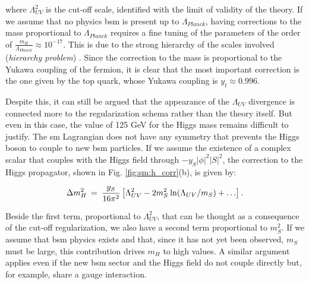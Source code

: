 where $\Lambda_{UV}^2$ is the cut-off scale, identified with the limit of validity of the theory. If we assume that no physics \gls{bsm} is present up to $\Lambda_{Planck}$, having corrections to the mass proportional to $\Lambda_{Planck}$ requires a fine tuning of the parameters of the order of $\frac{m_H}{\Lambda_{Planck}} \approx 10^{-17}$. This is due to the strong hierarchy of the scales involved (\textit{hierarchy problem}) \cite{Weinberg:1975gm, PhysRevD.20.2619, PhysRevD.14.1667, tHooft:1979rat}. Since the correction to the mass is proportional to the Yukawa coupling of the fermion, it is clear that the most important correction is the one given by the top quark, whose Yukawa coupling is $y_t \approx 0.996$. 

Despite this, it can still be argued that the appearance of the $\Lambda_{UV}$ divergence is connected more to the regularization schema rather than the theory itself. But even in this case, the value of 125 GeV for the Higgs mass remains difficult to justify. The \gls{sm} Lagrangian does not have any symmetry that prevents the Higgs boson to couple to new \gls{bsm} particles. If we assume the existence of a complex scalar that couples with the Higgs field through $ -y_S|\phi|^2 |S|^2$, the correction to the Higgs propagator, shown in Fig. \ref{fig:sm:h_corr}(b), is given by:

\begin{equation}
\Delta m_H^2 \>=\> {y_S\over 16 \pi^2}
\left [\Lambda_{UV}^2 - 2 m_S^2
\> {\rm ln}(\Lambda_{UV}/m_S) + \ldots
\right ].
\label{eq:divhs}
\end{equation}

\noindent Beside the first term, proportional to $\Lambda_{UV}^2$, that can be thought as a consequence of the cut-off regularization, we also have a second  term proportional to $m_S^2$. If we assume that \gls{bsm} physics exists and that, since it has not yet been observed, $m_S$ must be large, this contribution drives $m_H$ to high values. A similar argument applies even if the new \gls{bsm} sector and the Higgs field do not couple directly but, for example, share a gauge interaction.

